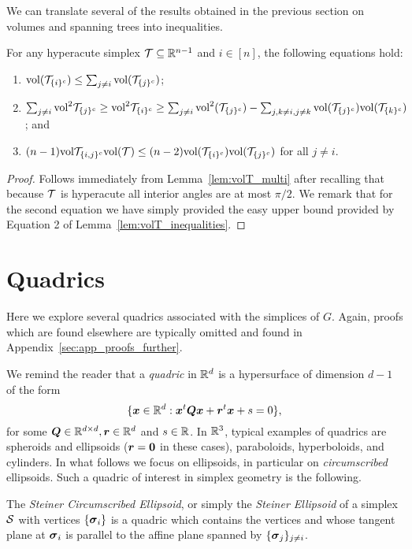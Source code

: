 We can translate several of the results obtained in the previous section on  volumes and spanning  trees into inequalities. 

\begin{lemma}
\label{lem:volT_inequalities}
For any hyperacute simplex $\mathcal{T}\subseteq\mathbb{R}^{n-1}$ and  $i\in[n]$, the following equations hold:
\begin{enumerate}
	\item $\textnormal{vol}(\mathcal{T}_{\{i\}^c}) \leq \sum_{j\neq i}\textnormal{vol}(\mathcal{T}_{\{j\}^c})$;
	\item $\sum_{j\neq i}\textnormal{vol}^2\mathcal{T}_{\{j\}^c}\geq \textnormal{vol}^2\mathcal{T}_{\{i\}^c}\geq   \sum_{j\neq i}\textnormal{vol}^2(\mathcal{T}_{\{j\}^c}) - \sum_{j,k\neq i,j\neq k} \textnormal{vol}(\mathcal{T}_{\{j\}^c})\textnormal{vol}(\mathcal{T}_{\{k\}^c})$; and
	\item $(n-1)\textnormal{vol}\mathcal{T}_{\{i,j\}^c}\textnormal{vol}(\mathcal{T}) \leq  (n-2)\textnormal{vol}(\mathcal{T}_{\{i\}^c})\textnormal{vol}(\mathcal{T}_{\{j\}^c})$ for  all $j\neq i$.
\end{enumerate}
\end{lemma}
\begin{proof}
	Follows immediately from Lemma~\ref{lem:volT_multi} after  recalling that because $\mathcal{T}$  is  hyperacute all interior  angles are at most $\pi/2$. We remark that for the second  equation  we have simply provided the  easy  upper bound provided by Equation 2 of Lemma~\ref{lem:volT_inequalities}. 
\end{proof}



\section{Quadrics}
\label{sec:quadrics}

Here we explore several quadrics associated with the simplices of $G$. Again,  proofs which  are  found elsewhere are typically omitted and found in Appendix~\ref{sec:app_proofs_further}. 

We remind the reader that a  \emph{quadric} in $\mathbb{R}^d$ is a hypersurface of dimension $d-1$ of the form 
\begin{equation*}
\{\vb*{x}\in\mathbb{R}^d: \vb*{x}^t \vb*{Q}\vb*{x} + \vb*{r}^t \vb*{x} + s=0\},
\end{equation*}
for some $\vb*{Q}\in\mathbb{R}^{d\times d},\vb*{r}\in\mathbb{R}^d$  and $s\in \mathbb{R}$. 
In $\mathbb{R}^3$, typical examples of quadrics are spheroids and ellipsoids ($\vb*{r}=\vb{0}$ in these cases), paraboloids, hyperboloids, and  cylinders. In what follows we focus on ellipsoids, in particular on \emph{circumscribed} ellipsoids. Such a quadric of interest in simplex geometry is the following. 

\begin{definition}
\label{def:steiner_ellipsoid}
The \emph{Steiner Circumscribed Ellipsoid}, or simply the \emph{Steiner Ellipsoid} of a simplex $\mathcal{S}$ with vertices $\{\vb*{\sigma}_i\}$ is a quadric which contains the vertices and whose tangent plane at $\vb*{\sigma}_i$ is parallel to the affine plane spanned by $\{\vb*{\sigma}_j\}_{j\neq i}$. 
\end{definition}

